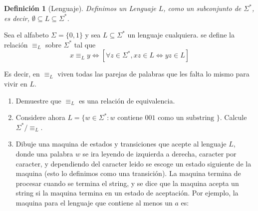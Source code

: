\documentclass[letterpaper,10pt]{article}
\theoremstyle{plain}
\newtheorem{defi}{Definición}[section]
\begin{document}
\begin{enumerate}[\bf P1.]
\begin{multicols}{2}
        \begin{defi}[Lenguaje]
            Definimos un Lenguaje $L$, como un subconjunto de $\Sigma^*$, es decir, $\emptyset \subseteq L \subseteq \Sigma^*$.
        \end{defi}
        \end{multicols}
    Sea el alfabeto $\Sigma=\{0,1\}$ y sea $L\subseteq \Sigma^*$ un lenguaje cualquiera. se define la relación $\equiv_L$ sobre $\Sigma^*$ tal que
        $$ x\equiv_Ly \iff [\forall z\in \Sigma^*, xz \in L \Leftrightarrow yz\in L]$$
    
    Es decir, en $\equiv_L$ viven todas las parejas de palabras que les falta lo mismo para vivir en $L$.
    \begin{enumerate}
        \item Demuestre que $\equiv_L$ es una relación de equivalencia.
        \item Considere ahora $L=\{w \in \Sigma^* : w \text{ contiene } 001 \text{ como un substring } \}$. Calcule $\Sigma^*/\equiv_L$.
        \item Dibuje una maquina de estados y transiciones que acepte al lenguaje $L$, donde una palabra $w$ se ira leyendo de izquierda a derecha, caracter por caracter, y dependiendo del caracter leido se escoge un estado siguiente de la maquina (esto lo definimos como una transición). La maquina termina de procesar cuando se termina el string, y se dice que la maquina acepta un string si la maquina termina en un estado de aceptación. 
        Por ejemplo, la maquina para el lenguaje que contiene al menos un $a$ es:
        
        \begin{center}
        \end{center}
        

\end{enumerate}
\end{enumerate}
\end{document}
